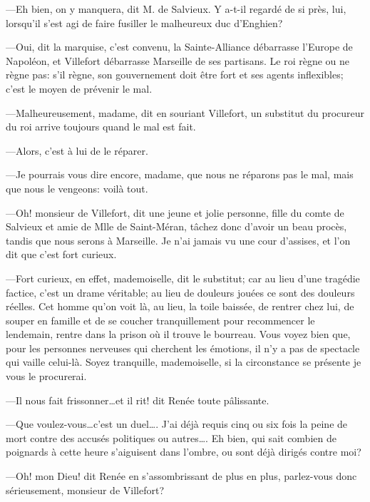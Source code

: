 —Eh bien, on y manquera, dit M. de Salvieux. Y a-t-il regardé de si près, lui, lorsqu'il s'est agi de faire fusiller le malheureux duc d'Enghien?

—Oui, dit la marquise, c'est convenu, la Sainte-Alliance débarrasse l'Europe de Napoléon, et Villefort débarrasse Marseille de ses partisans. Le roi règne ou ne règne pas: s'il règne, son gouvernement doit être fort et ses agents inflexibles; c'est le moyen de prévenir le mal.

—Malheureusement, madame, dit en souriant Villefort, un substitut du procureur du roi arrive toujours quand le mal est fait.

—Alors, c'est à lui de le réparer.

—Je pourrais vous dire encore, madame, que nous ne réparons pas le mal, mais que nous le vengeons: voilà tout.

—Oh! monsieur de Villefort, dit une jeune et jolie personne, fille du comte de Salvieux et amie de Mlle de Saint-Méran, tâchez donc d'avoir un beau procès, tandis que nous serons à Marseille. Je n'ai jamais vu une cour d'assises, et l'on dit que c'est fort curieux.

—Fort curieux, en effet, mademoiselle, dit le substitut; car au lieu d'une tragédie factice, c'est un drame véritable; au lieu de douleurs jouées ce sont des douleurs réelles. Cet homme qu'on voit là, au lieu, la toile baissée, de rentrer chez lui, de souper en famille et de se coucher tranquillement pour recommencer le lendemain, rentre dans la prison où il trouve le bourreau. Vous voyez bien que, pour les personnes nerveuses qui cherchent les émotions, il n'y a pas de spectacle qui vaille celui-là. Soyez tranquille, mademoiselle, si la circonstance se présente je vous le procurerai.

—Il nous fait frissonner\dots et il rit! dit Renée toute pâlissante.

—Que voulez-vous\dots c'est un duel\dots. J'ai déjà requis cinq ou six fois la peine de mort contre des accusés politiques ou autres\dots. Eh bien, qui sait combien de poignards à cette heure s'aiguisent dans l'ombre, ou sont déjà dirigés contre moi?

—Oh! mon Dieu! dit Renée en s'assombrissant de plus en plus, parlez-vous donc sérieusement, monsieur de Villefort?

